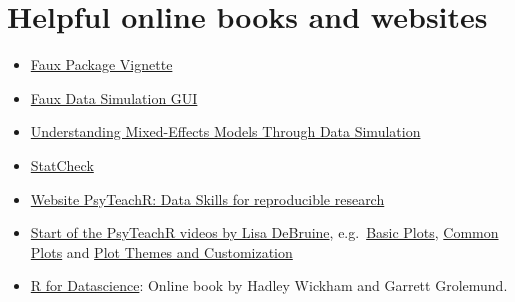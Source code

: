 \documentclass[
  letterpaper,
  DIV=11,
  numbers=noendperiod,
  oneside]{scrreprt}
\begin{document}
\hypertarget{helpful-online-books-and-websites}{%
\section*{Helpful online books and
websites}\label{helpful-online-books-and-websites}}


\begin{itemize}
\item
  \href{https://debruine.github.io/faux/index.html}{Faux Package
  Vignette}
\item
  \href{https://shiny.psy.gla.ac.uk/debruine/fauxapp}{Faux Data
  Simulation GUI}
\item
  \href{https://journals.sagepub.com/doi/10.1177/2515245920965119}{Understanding
  Mixed-Effects Models Through Data Simulation}
\item
  \href{https://michelenuijten.shinyapps.io/statcheck-web}{StatCheck}
\item
  \href{https://psyteachr.github.io/reprores-v3}{Website PsyTeachR: Data
  Skills for reproducible research}
\item
  \href{https://youtu.be/90IdULVGmYY}{Start of the PsyTeachR videos by
  Lisa DeBruine}, e.g.~\href{https://youtu.be/tOFQFPRgZ3M}{Basic Plots},
  \href{https://youtu.be/kKlQupjD__g}{Common Plots} and
  \href{https://youtu.be/6pHuCbOh86s}{Plot Themes and Customization}
\item
  \href{https://r4ds.had.co.nz}{R for Datascience}: Online book by
  Hadley Wickham and Garrett Grolemund.
\end{itemize}
\end{document}
